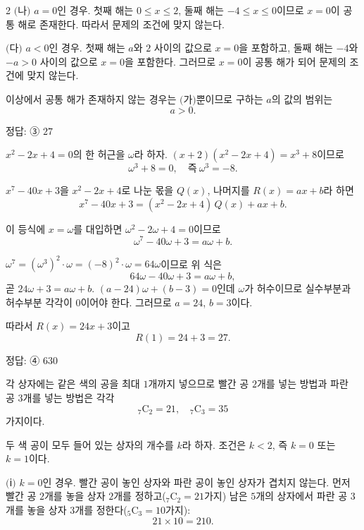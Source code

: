 \documentclass[10pt]{article}
\begin{document}
\begin{multicols}{2}
$(\!$나$)$ $a = 0$인 경우. 첫째 해는 $0 \le x \le 2$, 둘째 해는 $-4 \le x \le 0$이므로 $x = 0$이 공통 해로 존재한다. 따라서 문제의 조건에 맞지 않는다.

$(\!$다$)$ $a < 0$인 경우. 첫째 해는 $a$와 $2$ 사이의 값으로 $x = 0$을 포함하고, 둘째 해는 $-4$와 $-a > 0$ 사이의 값으로 $x = 0$을 포함한다. 그러므로 $x = 0$이 공통 해가 되어 문제의 조건에 맞지 않는다.

이상에서 공통 해가 존재하지 않는 경우는 $(\!$가$)$뿐이므로 구하는 $a$의 값의 범위는
\[ a > 0. \]

\begin{answerbox}정답: ③ $27$\end{answerbox}

$x^2 - 2x + 4 = 0$의 한 허근을 $\omega$라 하자. $(x + 2)(x^2 - 2x + 4) = x^3 + 8$이므로
\[ \omega^3 + 8 = 0,\quad \text{즉}\ \omega^3 = -8. \]

$x^7 - 40x + 3$을 $x^2 - 2x + 4$로 나눈 몫을 $Q(x)$, 나머지를 $R(x) = ax + b$라 하면
\[ x^7 - 40x + 3 = (x^2 - 2x + 4)\,Q(x) + ax + b. \]

이 등식에 $x = \omega$를 대입하면 $\omega^2 - 2\omega + 4 = 0$이므로
\[ \omega^7 - 40\omega + 3 = a\omega + b. \]

$\omega^7 = (\omega^3)^2 \cdot \omega = (-8)^2 \cdot \omega = 64\omega$이므로 위 식은
\[ 64\omega - 40\omega + 3 = a\omega + b, \]
곧 $24\omega + 3 = a\omega + b$. $(a - 24)\omega + (b - 3) = 0$인데 $\omega$가 허수이므로 실수부분과 허수부분 각각이 $0$이어야 한다. 그러므로 $a = 24$, $b = 3$이다.

따라서 $R(x) = 24x + 3$이고
\[ R(1) = 24 + 3 = 27. \]

\begin{answerbox}정답: ④ $630$\end{answerbox}

각 상자에는 같은 색의 공을 최대 $1$개까지 넣으므로 빨간 공 $2$개를 넣는 방법과 파란 공 $3$개를 넣는 방법은 각각
\[ {}_7\mathrm{C}_2 = 21,\quad {}_7\mathrm{C}_3 = 35 \]
가지이다.

두 색 공이 모두 들어 있는 상자의 개수를 $k$라 하자. 조건은 $k < 2$, 즉 $k = 0$ 또는 $k = 1$이다.

$(\!$ⅰ$)$ $k = 0$인 경우. 빨간 공이 놓인 상자와 파란 공이 놓인 상자가 겹치지 않는다. 먼저 빨간 공 $2$개를 놓을 상자 $2$개를 정하고(${}_7\mathrm{C}_2 = 21$가지) 남은 $5$개의 상자에서 파란 공 $3$개를 놓을 상자 $3$개를 정한다(${}_5\mathrm{C}_3 = 10$가지):
\[ 21 \times 10 = 210. \]


\end{multicols}
\end{document}
